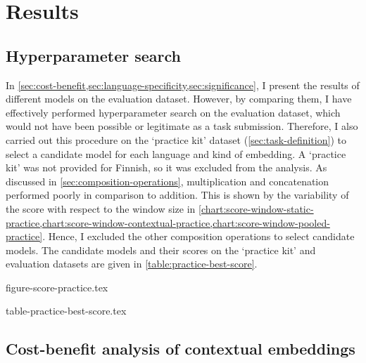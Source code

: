 \section{Results}
\label{sec:results}

\subsection{Hyperparameter search}
\label{sec:hyperparameter-search}

In \cref{sec:cost-benefit,sec:language-specificity,sec:significance}, I present the
results of different models on the evaluation dataset.
However, by comparing them, I have effectively performed hyperparameter search on the
evaluation dataset, which would not have been possible or legitimate as a task
submission.
Therefore, I also carried out this procedure on the `practice kit' dataset
(\cref{sec:task-definition}) to select a candidate model for each language and kind of
embedding.
A `practice kit' was not provided for Finnish, so it was excluded from the analysis.
As discussed in \cref{sec:composition-operations}, multiplication and concatenation
performed poorly in comparison to addition.
This is shown by the variability of the score with respect to the window size in
\cref{chart:score-window-static-practice,chart:score-window-contextual-practice,chart:score-window-pooled-practice}.
Hence, I excluded the other composition operations to select candidate models.
The candidate models and their scores on the `practice kit' and evaluation datasets are
given in \cref{table:practice-best-score}.

{figure-score-practice.tex}

{table-practice-best-score.tex}

\subsection{Cost-benefit analysis of contextual embeddings}
\label{sec:cost-benefit}

